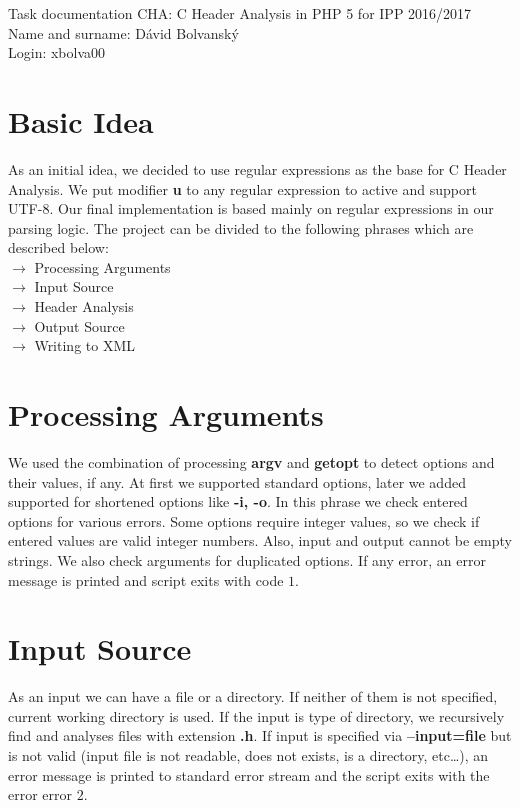 \documentclass[10pt,a4paper]{article}
\author{Dávid Bolvanský}
\begin{document}
	\noindent
	Task documentation CHA: C Header Analysis in PHP 5 for IPP 2016/2017\\
	Name and surname: Dávid Bolvanský\\
	Login: xbolva00

\section{Basic Idea}
	As an initial idea, we decided to use regular expressions as the base for C Header Analysis. We put modifier \textbf{u} to any regular expression to active and support UTF-8. Our final implementation is based mainly on regular expressions in our parsing logic. The project can be divided to the following phrases which are described below:\\
	$\rightarrow$ Processing Arguments\\ 
	$\rightarrow$ Input Source\\ 
	$\rightarrow$ Header Analysis\\
	$\rightarrow$ Output Source\\
	$\rightarrow$ Writing to XML
	
	
\section{Processing Arguments}
	We used the combination of processing \textbf{argv} and \textbf{getopt} to detect options and their values, if any. At first we supported standard options, later we added supported for shortened options like \textbf{-i, -o}. In this phrase we check entered options for various errors. Some options require integer values, so we check if entered values are valid integer numbers. Also, input and output cannot be empty strings. We also check arguments for duplicated options. If any error, an error message is printed and script exits with code $1$. 
	
\section{Input Source}
	As an input we can have a file or a directory. If neither of them is not specified, current working directory is used. If the input is type of directory, we recursively find and analyses files with extension \textbf{.h}. If input is specified via \textbf{--input=file} but is not valid (input file is not readable, does not exists, is a directory, etc\dots), an error message is printed to standard error stream and the script exits with the error error $2$.
	
\end{document}
